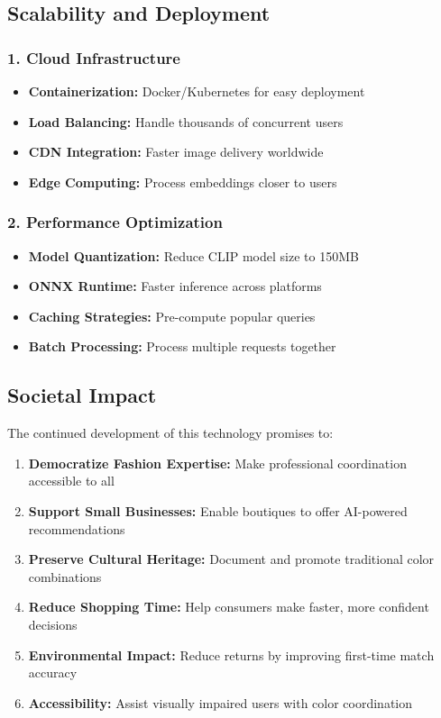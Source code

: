 \documentclass[12pt,a4paper]{report}
\begin{document}
\subsection{Scalability and Deployment}

\subsubsection{1. Cloud Infrastructure}
\begin{itemize}
    \item \textbf{Containerization:} Docker/Kubernetes for easy deployment
    \item \textbf{Load Balancing:} Handle thousands of concurrent users
    \item \textbf{CDN Integration:} Faster image delivery worldwide
    \item \textbf{Edge Computing:} Process embeddings closer to users
\end{itemize}

\subsubsection{2. Performance Optimization}
\begin{itemize}
    \item \textbf{Model Quantization:} Reduce CLIP model size to 150MB
    \item \textbf{ONNX Runtime:} Faster inference across platforms
    \item \textbf{Caching Strategies:} Pre-compute popular queries
    \item \textbf{Batch Processing:} Process multiple requests together
\end{itemize}

\subsection{Societal Impact}

The continued development of this technology promises to:

\begin{enumerate}
    \item \textbf{Democratize Fashion Expertise:} Make professional coordination accessible to all
    \item \textbf{Support Small Businesses:} Enable boutiques to offer AI-powered recommendations
    \item \textbf{Preserve Cultural Heritage:} Document and promote traditional color combinations
    \item \textbf{Reduce Shopping Time:} Help consumers make faster, more confident decisions
    \item \textbf{Environmental Impact:} Reduce returns by improving first-time match accuracy
    \item \textbf{Accessibility:} Assist visually impaired users with color coordination
\end{enumerate}
\end{document}
